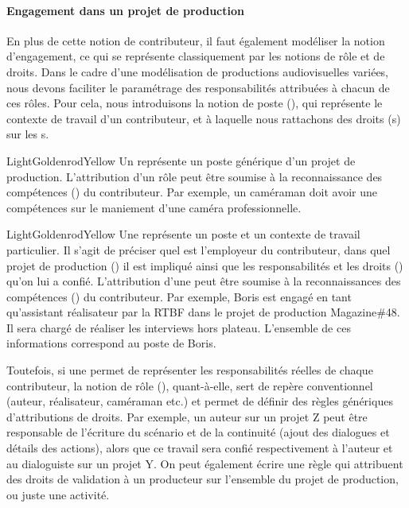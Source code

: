 \paragraph{Engagement dans un projet de production}
En plus de cette notion de contributeur, il faut également modéliser la notion d'engagement, ce qui se représente classiquement par les notions de rôle et de droits.
Dans le cadre d'une modélisation de productions audiovisuelles variées, nous devons faciliter le paramétrage des responsabilités attribuées à chacun de ces rôles. 
Pour cela, nous introduisons la notion de poste (), qui représente le contexte de travail d'un contributeur, et à laquelle nous rattachons des droits (s) sur les s.

\begin{cadrecol}{LightGoldenrodYellow}
Un  représente un poste générique d'un projet de production. 
L'attribution d'un rôle peut être soumise à la reconnaissance des compétences () du contributeur.
Par exemple, un caméraman doit avoir une compétences sur le maniement d'une caméra professionnelle.
\end{cadrecol}

\begin{cadrecol}{LightGoldenrodYellow}
Une  représente un poste et un contexte de travail particulier.
Il s'agit de préciser quel est l'employeur du contributeur, dans quel projet de production () il est impliqué ainsi que les responsabilités et les droits () qu'on lui a confié. 
L'attribution d'une  peut être soumise à la reconnaissances des compétences () du contributeur.
Par exemple, Boris est engagé en tant qu'assistant réalisateur par la RTBF dans le projet de production Magazine\#48.
Il sera chargé de réaliser les interviews hors plateau.
L'ensemble de ces informations correspond au poste de Boris.
\end{cadrecol}

Toutefois, si une  permet de représenter les responsabilités réelles de chaque contributeur, la notion de rôle (), quant-à-elle, sert de repère conventionnel (auteur, réalisateur, caméraman etc.) et permet de définir des règles génériques d'attributions de droits.
Par exemple, un auteur sur un projet Z peut être responsable de l'écriture du scénario et de la continuité (ajout des dialogues et détails des actions), alors que ce travail sera confié respectivement à l'auteur et au dialoguiste sur un projet Y.
On peut également écrire une règle qui attribuent des droits de validation à un producteur sur l'ensemble du projet de production, ou juste une activité.


